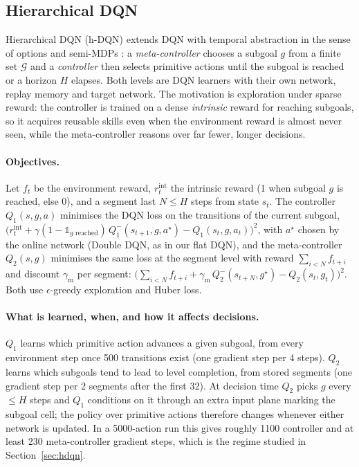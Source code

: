 \subsection{Hierarchical DQN}\label{sec:bg-hdqn}
Hierarchical DQN (h-DQN) \citep{kulkarni2016hdqn} extends DQN with temporal
abstraction in the sense of options and semi-MDPs \citep{sutton1999options}: a
\emph{meta-controller} chooses a subgoal $g$ from a finite set $\mathcal{G}$ and a
\emph{controller} then selects primitive actions until the subgoal is reached or a
horizon $H$ elapses. Both levels are DQN learners with their own network, replay
memory and target network. The motivation is exploration under sparse reward: the
controller is trained on a dense \emph{intrinsic} reward for reaching subgoals,
so it acquires reusable skills even when the environment reward is almost never
seen, while the meta-controller reasons over far fewer, longer decisions.

\paragraph{Objectives.} Let $f_t$ be the environment reward, $r^{\text{int}}_t$ the
intrinsic reward (1 when subgoal $g$ is reached, else 0), and a segment last
$N\le H$ steps from state $s_t$. The controller $Q_1(s,g,a)$ minimises the DQN
loss on the transitions of the current subgoal,
$\big(r^{\text{int}}_t+\gamma(1-\mathbb 1_{g\text{ reached}})\,Q_1^{-}(s_{t+1},g,a^\star)-Q_1(s_t,g,a_t)\big)^2$,
with $a^\star$ chosen by the online network (Double DQN, as in our flat DQN), and the
meta-controller $Q_2(s,g)$ minimises the same loss at the segment level with reward
$\sum_{i<N}f_{t+i}$ and discount $\gamma_{\text{m}}$ per segment:
$\big(\sum_{i<N}f_{t+i}+\gamma_{\text{m}}\,Q_2^{-}(s_{t+N},g^\star)-Q_2(s_t,g_t)\big)^2$.
Both use $\epsilon$-greedy exploration and Huber loss.

\paragraph{What is learned, when, and how it affects decisions.} $Q_1$ learns which
primitive action advances a given subgoal, from every environment step once 500
transitions exist (one gradient step per 4 steps). $Q_2$ learns which subgoals tend
to lead to level completion, from stored segments (one gradient step per 2
segments after the first 32). At decision time $Q_2$ picks $g$ every $\le H$ steps
and $Q_1$ conditions on it through an extra input plane marking the subgoal
cell; the policy over primitive actions therefore changes whenever either network
is updated. In a 5000-action run this gives roughly 1100 controller and at least 230
meta-controller gradient steps, which is the regime studied in
Section~\ref{sec:hdqn}.
